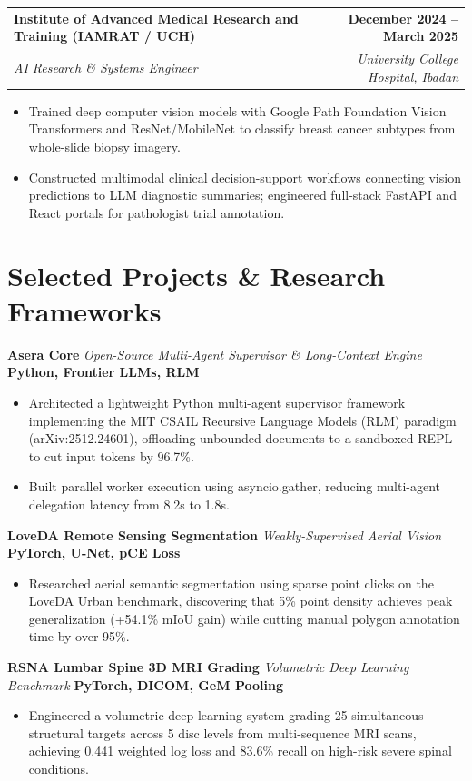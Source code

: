 \documentclass[10pt,letterpaper]{article}
\makeatletter
\newcommand{\resumeHeading}[4]{%
  \vspace{1.5pt}%
  \begin{tabularx}{\textwidth}{@{}>{\RaggedRight\arraybackslash}X r@{}}
    \textbf{#1} & \textbf{#2} \\
    \textit{#3} & \textit{#4} \\
  \end{tabularx}\vspace{-4pt}
}
\newcommand{\projectHeading}[3]{%
  \par\vspace{1.5pt}%
  \textbf{#1} \textbar{} \textit{#2} \hfill \textbf{#3}\par\vspace{-2pt}
}
\newcommand{\resumeItem}[1]{\item #1}
\makeatother
\begin{document}
\resumeHeading
{Institute of Advanced Medical Research and Training (IAMRAT / UCH)}
{December 2024 -- March 2025}
{AI Research \& Systems Engineer}
{University College Hospital, Ibadan}
\begin{itemize}
\resumeItem{Trained deep computer vision models with Google Path Foundation Vision Transformers and ResNet/MobileNet to classify breast cancer subtypes from whole-slide biopsy imagery.}
\resumeItem{Constructed multimodal clinical decision-support workflows connecting vision predictions to LLM diagnostic summaries; engineered full-stack FastAPI and React portals for pathologist trial annotation.}
\end{itemize}

\section{Selected Projects \& Research Frameworks}

\projectHeading{Asera Core}{Open-Source Multi-Agent Supervisor \& Long-Context Engine}{Python, Frontier LLMs, RLM}
\begin{itemize}
\resumeItem{Architected a lightweight Python multi-agent supervisor framework implementing the MIT CSAIL Recursive Language Models (RLM) paradigm (arXiv:2512.24601), offloading unbounded documents to a sandboxed REPL to cut input tokens by 96.7\%.}
\resumeItem{Built parallel worker execution using asyncio.gather, reducing multi-agent delegation latency from 8.2s to 1.8s.}
\end{itemize}

\projectHeading{LoveDA Remote Sensing Segmentation}{Weakly-Supervised Aerial Vision}{PyTorch, U-Net, pCE Loss}
\begin{itemize}
\resumeItem{Researched aerial semantic segmentation using sparse point clicks on the LoveDA Urban benchmark, discovering that 5\% point density achieves peak generalization (+54.1\% mIoU gain) while cutting manual polygon annotation time by over 95\%.}
\end{itemize}

\projectHeading{RSNA Lumbar Spine 3D MRI Grading}{Volumetric Deep Learning Benchmark}{PyTorch, DICOM, GeM Pooling}
\begin{itemize}
\resumeItem{Engineered a volumetric deep learning system grading 25 simultaneous structural targets across 5 disc levels from multi-sequence MRI scans, achieving 0.441 weighted log loss and 83.6\% recall on high-risk severe spinal conditions.}
\end{itemize}
\end{document}
